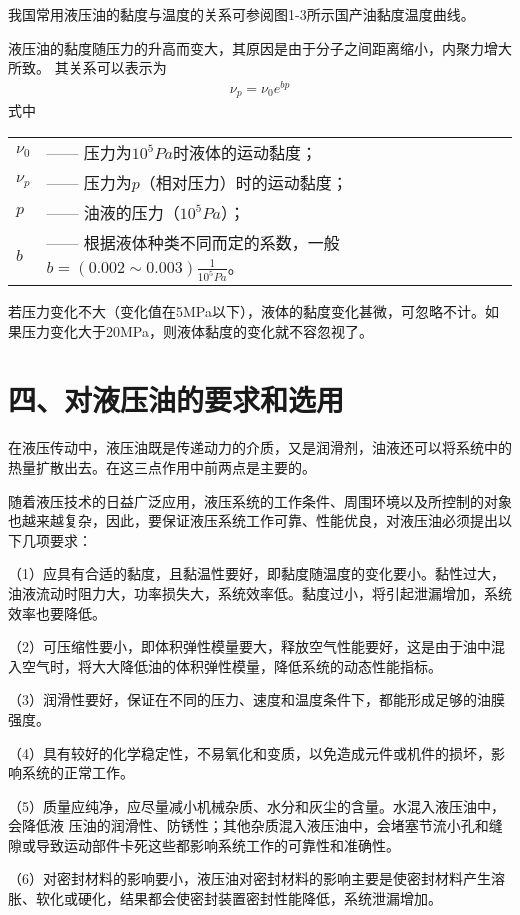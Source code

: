 我国常用液压油的黏度与温度的关系可参阅图1-3所示国产油黏度温度曲线。

液压油的黏度随压力的升高而变大，其原因是由于分子之间距离缩小，内聚力增大所致。
其关系可以表示为
\begin{gather}
    {\nu_{p}}={\nu_{0}}{e}^{bp} 
\end{gather}
    \newpage  
    \noindent 式中\ 
    \begin{tabular}[t]{ll}
        ${\nu_{0}}$ & —— 压力为$10^5Pa$时液体的运动黏度；\\
        ${\nu_{p}}$ & —— 压力为$p$（相对压力）时的运动黏度；\\
        $p$ & —— 油液的压力（$10^5Pa$）； \\
        $b$ & —— 根据液体种类不同而定的系数，一般$b=( 0.002\sim0.003)        {\frac {1}  { 10^{5} Pa} } $。
    \end{tabular}

    若压力变化不大（变化值在5MPa以下），液体的黏度变化甚微，可忽略不计。如果压力变化大于20MPa，则液体黏度的变化就不容忽视了。
          \section*{四、对液压油的要求和选用}
在液压传动中，液压油既是传递动力的介质，又是润滑剂，油液还可以将系统中的热量扩散出去。在这三点作用中前两点是主要的。

随着液压技术的日益广泛应用，液压系统的工作条件、周围环境以及所控制的对象也越来越复杂，因此，要保证液压系统工作可靠、性能优良，对液压油必须提出以下几项要求：

（1）应具有合适的黏度，且黏温性要好，即黏度随温度的变化要小。黏性过大，油液流动时阻力大，功率损失大，系统效率低。黏度过小，将引起泄漏增加，系统效率也要降低。

（2）可压缩性要小，即体积弹性模量要大，释放空气性能要好，这是由于油中混入空气时，将大大降低油的体积弹性模量，降低系统的动态性能指标。

（3）润滑性要好，保证在不同的压力、速度和温度条件下，都能形成足够的油膜强度。

（4）具有较好的化学稳定性，不易氧化和变质，以免造成元件或机件的损坏，影响系统的正常工作。

（5）质量应纯净，应尽量减小机械杂质、水分和灰尘的含量。水混入液压油中，会降低液
\newpage
压油的润滑性、防锈性；其他杂质混入液压油中，会堵塞节流小孔和缝隙或导致运动部件卡死这些都影响系统工作的可靠性和准确性。

（6）对密封材料的影响要小，液压油对密封材料的影响主要是使密封材料产生溶胀、软化或硬化，结果都会使密封装置密封性能降低，系统泄漏增加。


